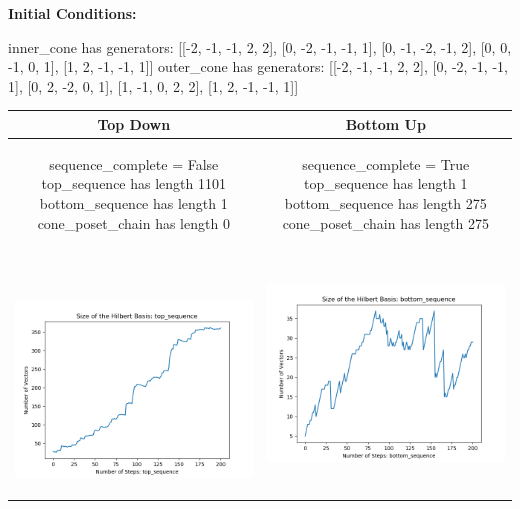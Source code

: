 \documentclass[10pt]{article}
\begin{document}
\textbf{Initial Conditions:}
\begin{SAGE}
inner_cone has generators: 
[[-2, -1, -1, 2, 2], [0, -2, -1, -1, 1], [0, -1, -2, -1, 2], [0, 0, -1, 0, 1], [1, 2, -1, -1, 1]]
outer_cone has generators: 
[[-2, -1, -1, 2, 2], [0, -2, -1, -1, 1], [0, 2, -2, 0, 1], [1, -1, 0, 2, 2], [1, 2, -1, -1, 1]]

\end{SAGE}
\begin{tabular}{c|c}
\textbf{Top Down} & \textbf{Bottom Up} \\ \hline  
\begin{SAGE}
	sequence_complete = False
	top_sequence has length 1101
	bottom_sequence has length 1
	cone_poset_chain has length 0
\end{SAGE} 
&
\begin{SAGE}
	sequence_complete = True
	top_sequence has length 1
	bottom_sequence has length 275
	cone_poset_chain has length 275
\end{SAGE} 
\\ \hline
\
\begin{minipage}{.45\textwidth}
\includegraphics[width=\textwidth]{"DATA/5d/5 generators 2 bound E/top_sequence SIZE"}
\end{minipage} &
\begin{minipage}{.45\textwidth}
\includegraphics[width=\textwidth]{"DATA/5d/5 generators 2 bound E bottomup/bottom_sequence SIZE"}

\end{minipage}
\end{tabular}
\end{document}
